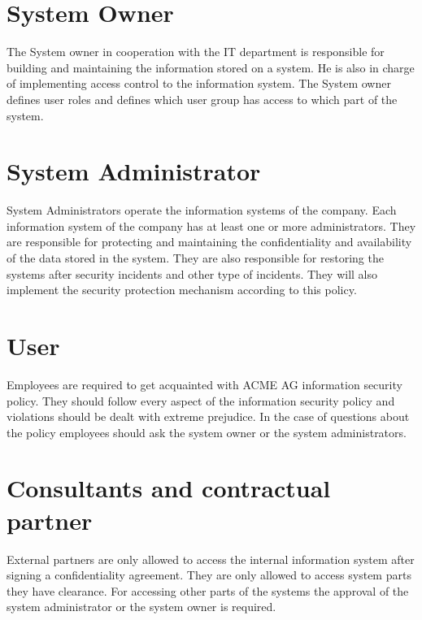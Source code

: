 \section{System Owner}
The System owner in cooperation with the IT department is responsible for building and maintaining the information stored on a system. He is also in charge of implementing access control to the information system. The System owner defines user roles and defines which user group has access to which part of the system.  
\section{System Administrator}
System Administrators operate the information systems of the company. Each information system of the company has at least one or more administrators. They are responsible for protecting and maintaining the confidentiality and availability of the data stored in the system. They are also responsible for restoring the systems after security incidents and other type of incidents. They will also implement the security protection mechanism according to this policy. 
\section{User}
Employees are required to get acquainted with ACME AG information security policy. They should follow every aspect of the information security policy and violations should be dealt with extreme prejudice. In the case of questions about the policy employees should ask the system owner or the system administrators.   
\section{Consultants and contractual partner}
External partners are only allowed to access the internal information system after signing a confidentiality agreement. They are only allowed to access system parts they have clearance. For accessing other parts of the systems the approval of the system administrator or the system owner is required. 
